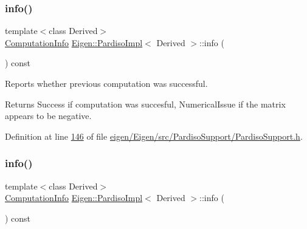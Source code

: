 \subsubsection{\texorpdfstring{info()}{info()}\hspace{0.1cm}{\footnotesize\ttfamily [1/2]}}
{\footnotesize\ttfamily template$<$class Derived$>$ \\
\hyperlink{group__enums_ga85fad7b87587764e5cf6b513a9e0ee5e}{Computation\+Info} \hyperlink{class_eigen_1_1_pardiso_impl}{Eigen\+::\+Pardiso\+Impl}$<$ Derived $>$\+::info (\begin{DoxyParamCaption}{ }\end{DoxyParamCaption}) const\hspace{0.3cm}{\ttfamily [inline]}}



Reports whether previous computation was successful. 

\begin{DoxyReturn}{Returns}
{\ttfamily Success} if computation was succesful, {\ttfamily Numerical\+Issue} if the matrix appears to be negative. 
\end{DoxyReturn}


Definition at line \hyperlink{eigen_2_eigen_2src_2_pardiso_support_2_pardiso_support_8h_source_l00146}{146} of file \hyperlink{eigen_2_eigen_2src_2_pardiso_support_2_pardiso_support_8h_source}{eigen/\+Eigen/src/\+Pardiso\+Support/\+Pardiso\+Support.\+h}.

\mbox{\label{class_eigen_1_1_pardiso_impl_a7dce1175518593e33d32e30ab0ffee3b}} 
\subsubsection{\texorpdfstring{info()}{info()}\hspace{0.1cm}{\footnotesize\ttfamily [2/2]}}
{\footnotesize\ttfamily template$<$class Derived$>$ \\
\hyperlink{group__enums_ga85fad7b87587764e5cf6b513a9e0ee5e}{Computation\+Info} \hyperlink{class_eigen_1_1_pardiso_impl}{Eigen\+::\+Pardiso\+Impl}$<$ Derived $>$\+::info (\begin{DoxyParamCaption}{ }\end{DoxyParamCaption}) const\hspace{0.3cm}{\ttfamily [inline]}}



